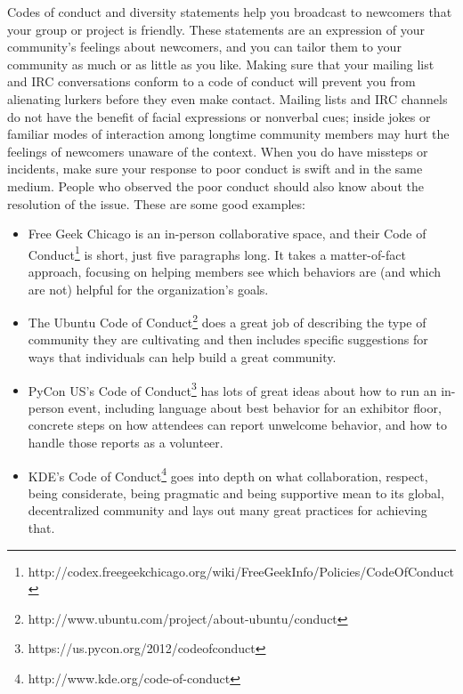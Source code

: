 Codes of conduct and diversity statements help you broadcast to newcomers that your group or project is friendly. These statements are an expression of your community’s feelings about newcomers, and you can tailor them to your community as much or as little as you like. Making sure that your mailing list and IRC conversations conform to a code of conduct will prevent you from alienating lurkers before they even make contact. Mailing lists and IRC channels do not have the benefit of facial expressions or nonverbal cues; inside jokes or familiar modes of interaction among longtime community members may hurt the feelings of newcomers unaware of the context. When you do have missteps or incidents, make sure your response to poor conduct is swift and in the same medium. People who observed the poor conduct should also know about the resolution of the issue. These are some good examples:
\begin{itemize}
  \item Free Geek Chicago is an in-person collaborative space, and their Code of Conduct\footnote{http://codex.freegeekchicago.org/wiki/FreeGeekInfo/Policies/CodeOfConduct} is short, just five paragraphs long. It takes a matter-of-fact approach, focusing on helping members see which behaviors are (and which are not) helpful for the organization’s goals.
  \item The Ubuntu Code of Conduct\footnote{http://www.ubuntu.com/project/about-ubuntu/conduct} does a great job of describing the type of community they are cultivating and then includes specific suggestions for ways that individuals can help build a great community.
  \item PyCon US's Code of Conduct\footnote{https://us.pycon.org/2012/codeofconduct} has lots of great ideas about how to run an in-person event, including language about best behavior for an exhibitor floor, concrete steps on how attendees can report unwelcome behavior, and how to handle those reports as a volunteer.
  \item KDE’s Code of Conduct\footnote{http://www.kde.org/code-of-conduct} goes into depth on what collaboration, respect, being considerate, being pragmatic and being supportive mean to its global, decentralized community and lays out many great practices for achieving that.
\end{itemize}

